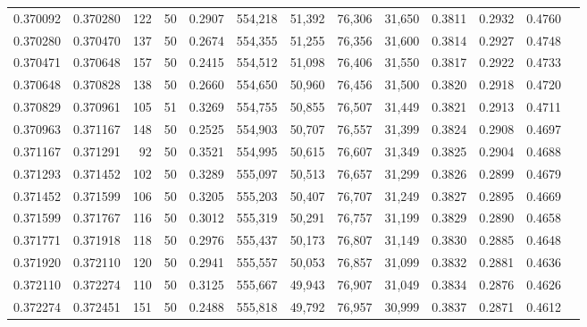 \begin{tabular}{rrrrrrrrrrrrr}
0.370092 & 0.370280 &   122 &  50 &                                     0.2907 & 554,218 &  51,392 &  76,306 &  31,650 & 0.3811 & 0.2932 & 0.4760 \\
0.370280 & 0.370470 &   137 &  50 &                                     0.2674 & 554,355 &  51,255 &  76,356 &  31,600 & 0.3814 & 0.2927 & 0.4748 \\
0.370471 & 0.370648 &   157 &  50 &                                     0.2415 & 554,512 &  51,098 &  76,406 &  31,550 & 0.3817 & 0.2922 & 0.4733 \\
0.370648 & 0.370828 &   138 &  50 &                                     0.2660 & 554,650 &  50,960 &  76,456 &  31,500 & 0.3820 & 0.2918 & 0.4720 \\
0.370829 & 0.370961 &   105 &  51 &                                     0.3269 & 554,755 &  50,855 &  76,507 &  31,449 & 0.3821 & 0.2913 & 0.4711 \\
0.370963 & 0.371167 &   148 &  50 &                                     0.2525 & 554,903 &  50,707 &  76,557 &  31,399 & 0.3824 & 0.2908 & 0.4697 \\
0.371167 & 0.371291 &    92 &  50 &                                     0.3521 & 554,995 &  50,615 &  76,607 &  31,349 & 0.3825 & 0.2904 & 0.4688 \\
0.371293 & 0.371452 &   102 &  50 &                                     0.3289 & 555,097 &  50,513 &  76,657 &  31,299 & 0.3826 & 0.2899 & 0.4679 \\
0.371452 & 0.371599 &   106 &  50 &                                     0.3205 & 555,203 &  50,407 &  76,707 &  31,249 & 0.3827 & 0.2895 & 0.4669 \\
0.371599 & 0.371767 &   116 &  50 &                                     0.3012 & 555,319 &  50,291 &  76,757 &  31,199 & 0.3829 & 0.2890 & 0.4658 \\
0.371771 & 0.371918 &   118 &  50 &                                     0.2976 & 555,437 &  50,173 &  76,807 &  31,149 & 0.3830 & 0.2885 & 0.4648 \\
0.371920 & 0.372110 &   120 &  50 &                                     0.2941 & 555,557 &  50,053 &  76,857 &  31,099 & 0.3832 & 0.2881 & 0.4636 \\
0.372110 & 0.372274 &   110 &  50 &                                     0.3125 & 555,667 &  49,943 &  76,907 &  31,049 & 0.3834 & 0.2876 & 0.4626 \\
0.372274 & 0.372451 &   151 &  50 &                                     0.2488 & 555,818 &  49,792 &  76,957 &  30,999 & 0.3837 & 0.2871 & 0.4612 \\

\end{tabular}
